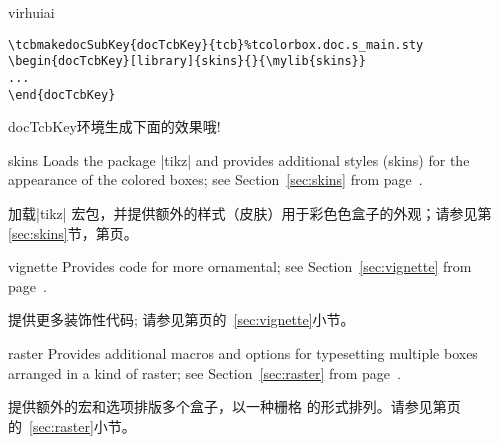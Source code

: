 \begin{引述之言}{virhuiai}
\begin{verbatim}
\tcbmakedocSubKey{docTcbKey}{tcb}%tcolorbox.doc.s_main.sty
\begin{docTcbKey}[library]{skins}{}{\mylib{skins}}
...
\end{docTcbKey}
\end{verbatim}
docTcbKey环境生成下面的效果哦!
\end{引述之言}


\begin{docTcbKey}[library]{skins}{}{}
Loads the package |tikz| %
and provides additional styles (skins) for the appearance of the colored boxes; 
see  Section~\ref{sec:skins} from page~\pageref{sec:skins}.


加载|tikz|%
宏包，并提供额外的样式（皮肤）用于彩色色盒子的外观；请参见第\ref{sec:skins}节，第\pageref{sec:skins}页。

\end{docTcbKey}

\begin{docTcbKey}[library]{vignette}{}{}
Provides code for more ornamental; see
Section~\ref{sec:vignette} from page~\pageref{sec:vignette}.

提供更多装饰性代码; 请参见第\pageref{sec:vignette}页的~\ref{sec:vignette}小节。

\end{docTcbKey}

\begin{docTcbKey}[library]{raster}{}{}
Provides additional macros and options for typesetting 
multiple boxes arranged in a kind of raster;
see Section~\ref{sec:raster} from page~\pageref{sec:raster}.

提供额外的宏和选项排版多个盒子，以一种栅格\footnotemark%
的形式排列。请参见第\pageref{sec:raster}页的~\ref{sec:raster}小节。
\end{docTcbKey}
    
